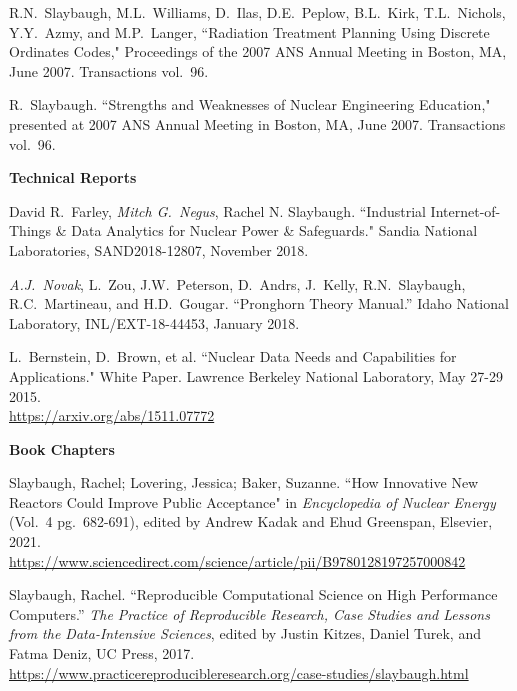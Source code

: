 \begin{bibsection}
\item R.N.\ Slaybaugh, M.L.\ Williams, D.\ Ilas, D.E.\ Peplow, B.L.\ Kirk, T.L.\ Nichols, Y.Y.\ Azmy, and M.P.\ Langer, ``Radiation Treatment Planning Using Discrete Ordinates Codes," Proceedings of the 2007 ANS Annual Meeting in Boston, MA, June 2007. Transactions vol.\ 96.

\item R.\ Slaybaugh. ``Strengths and Weaknesses of Nuclear Engineering Education," presented at 2007 ANS Annual Meeting in Boston, MA, June 2007. Transactions vol.\ 96.

\item \textbf{Technical Reports}
\item David R.\ Farley, \textit{Mitch G.\ Negus}, Rachel N.
 Slaybaugh. ``Industrial Internet-of-Things \& Data Analytics for Nuclear Power \& Safeguards." Sandia National Laboratories, SAND2018-12807, November 2018.

\item	\textit{A.J.\ Novak}, L.\ Zou, J.W.\ Peterson, D.\ Andrs, J.\ Kelly, R.N.\ Slaybaugh, R.C.\ Martineau, and H.D.\ Gougar. “Pronghorn Theory Manual.” Idaho National Laboratory, INL/EXT-18-44453, January 2018.

\item L.\ Bernstein, D.\ Brown, et al. ``Nuclear Data Needs and Capabilities for Applications." White Paper. Lawrence Berkeley National Laboratory, May 27-29 2015. \\
\url{https://arxiv.org/abs/1511.07772}


\item \textbf{Book Chapters}
\item Slaybaugh, Rachel; Lovering, Jessica; Baker, Suzanne. ``How Innovative New Reactors
Could Improve Public Acceptance" in \textit{Encyclopedia of Nuclear Energy} (Vol.\ 4 pg.\ 682-691), edited by Andrew Kadak and Ehud Greenspan, Elsevier, 2021. \\ \url{https://www.sciencedirect.com/science/article/pii/B9780128197257000842}

\item Slaybaugh, Rachel. ``Reproducible Computational Science on High Performance Computers.'' \textit{The Practice of Reproducible Research, Case Studies and Lessons from the Data-Intensive Sciences}, edited by Justin Kitzes, Daniel Turek, and Fatma Deniz, UC Press, 2017. \\ \url{https://www.practicereproducibleresearch.org/case-studies/slaybaugh.html}



\end{bibsection}
